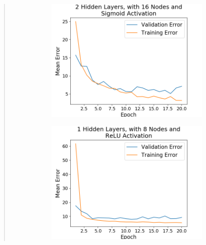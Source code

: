 \documentclass{article}
\begin{document}
\begin{quote}
\begin{figure}[h]
\begin{subfigure}[h]{0.23\textwidth}
		\includegraphics[width=\textwidth]{figs/Boston_Housing_Regression_2_Hidden_Layers_with_16_Nodes_and_Sigmoid_Activation.png}
		\end{subfigure}
	\end{figure}	
	 \begin{figure}[h]
	\centering
	\begin{subfigure}[h]{0.23\textwidth}
		\includegraphics[width=\textwidth]{figs/Boston_Housing_Regression_1_Hidden_Layers_with_8_Nodes_and_ReLU_Activation.png}
	\end{subfigure}
	\begin{subfigure}[h]{0.23\textwidth}

\end{subfigure}
\end{figure}
\end{quote}
\end{document}
